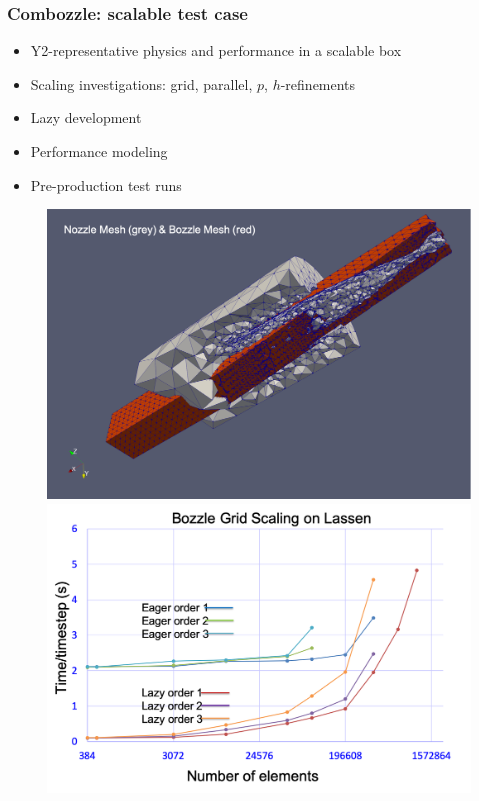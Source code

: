 \begin{frame}\frametitle{Combozzle: scalable test case}
  \begin{minipage}{0.45\textwidth}		
    \begin{itemize}
    \item Y2-representative physics and performance in a scalable box
    \item Scaling investigations: grid, parallel, {$p$, $h$}-refinements
    \item Lazy development
    \item Performance modeling
    \item Pre-production test runs
    \end{itemize}
  \end{minipage}
  \begin{minipage}{0.5\textwidth}
    \begin{figure}
      \centering
      \includegraphics[width=\textwidth]{figures/bono2.png} \\
      \includegraphics[width=\textwidth]{figures/bozzle_gridscale.png}
    \end{figure}		
  \end{minipage}
\end{frame}

